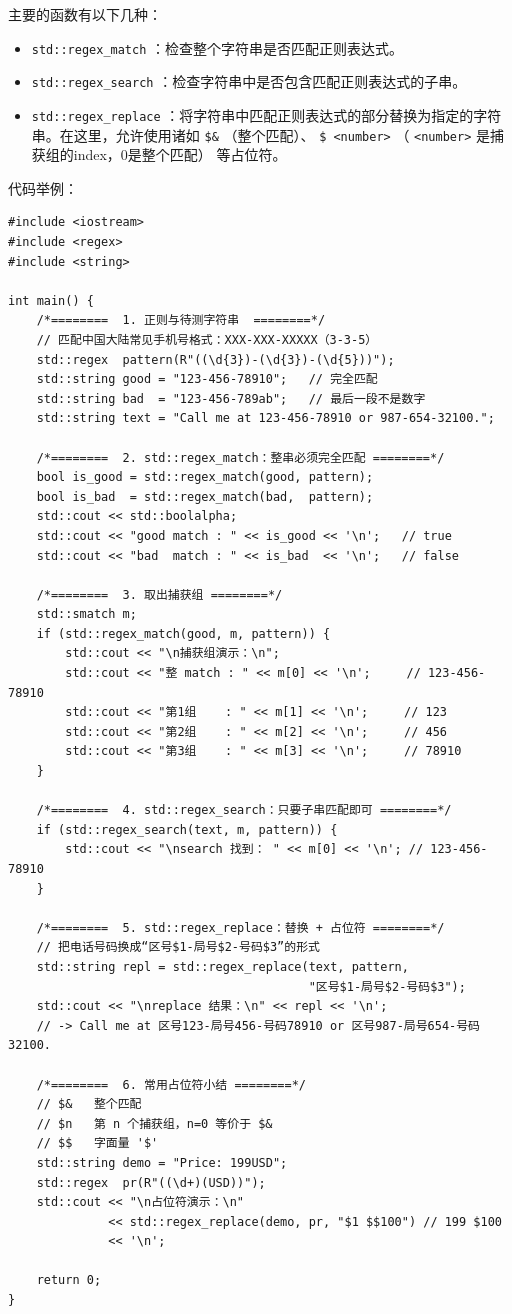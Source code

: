 主要的函数有以下几种：
\begin{itemize}
  \item  \texttt{std::regex\_match} ：检查整个字符串是否匹配正则表达式。
  \item  \texttt{std::regex\_search} ：检查字符串中是否包含匹配正则表达式的子串。
  \item  \texttt{std::regex\_replace} ：将字符串中匹配正则表达式的部分替换为指定的字符串。在这里，允许使用诸如 \texttt{\$\&} （整个匹配）、 \texttt{\$ <number>} （ \texttt{<number>} 是捕获组的index，0是整个匹配）
    等占位符。
\end{itemize}

代码举例：
\begin{verbatim}
#include <iostream>
#include <regex>
#include <string>

int main() {
    /*========  1. 正则与待测字符串  ========*/
    // 匹配中国大陆常见手机号格式：XXX-XXX-XXXXX（3-3-5）
    std::regex  pattern(R"((\d{3})-(\d{3})-(\d{5}))");
    std::string good = "123-456-78910";   // 完全匹配
    std::string bad  = "123-456-789ab";   // 最后一段不是数字
    std::string text = "Call me at 123-456-78910 or 987-654-32100.";

    /*========  2. std::regex_match：整串必须完全匹配 ========*/
    bool is_good = std::regex_match(good, pattern);
    bool is_bad  = std::regex_match(bad,  pattern);
    std::cout << std::boolalpha;
    std::cout << "good match : " << is_good << '\n';   // true
    std::cout << "bad  match : " << is_bad  << '\n';   // false

    /*========  3. 取出捕获组 ========*/
    std::smatch m;
    if (std::regex_match(good, m, pattern)) {
        std::cout << "\n捕获组演示：\n";
        std::cout << "整 match : " << m[0] << '\n';     // 123-456-78910
        std::cout << "第1组    : " << m[1] << '\n';     // 123
        std::cout << "第2组    : " << m[2] << '\n';     // 456
        std::cout << "第3组    : " << m[3] << '\n';     // 78910
    }

    /*========  4. std::regex_search：只要子串匹配即可 ========*/
    if (std::regex_search(text, m, pattern)) {
        std::cout << "\nsearch 找到： " << m[0] << '\n'; // 123-456-78910
    }

    /*========  5. std::regex_replace：替换 + 占位符 ========*/
    // 把电话号码换成“区号$1-局号$2-号码$3”的形式
    std::string repl = std::regex_replace(text, pattern,
                                          "区号$1-局号$2-号码$3");
    std::cout << "\nreplace 结果：\n" << repl << '\n';
    // -> Call me at 区号123-局号456-号码78910 or 区号987-局号654-号码32100.

    /*========  6. 常用占位符小结 ========*/
    // $&   整个匹配
    // $n   第 n 个捕获组，n=0 等价于 $&
    // $$   字面量 '$'
    std::string demo = "Price: 199USD";
    std::regex  pr(R"((\d+)(USD))");
    std::cout << "\n占位符演示：\n"
              << std::regex_replace(demo, pr, "$1 $$100") // 199 $100
              << '\n';

    return 0;
}
\end{verbatim}

